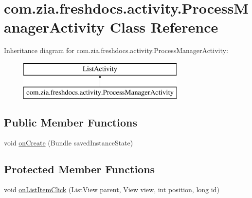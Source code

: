 \hypertarget{classcom_1_1zia_1_1freshdocs_1_1activity_1_1_process_manager_activity}{\section{com.\-zia.\-freshdocs.\-activity.\-Process\-Manager\-Activity Class Reference}
\label{classcom_1_1zia_1_1freshdocs_1_1activity_1_1_process_manager_activity}
}
Inheritance diagram for com.\-zia.\-freshdocs.\-activity.\-Process\-Manager\-Activity\-:\begin{figure}[H]
\begin{center}
\leavevmode
\includegraphics[height=2.000000cm]{classcom_1_1zia_1_1freshdocs_1_1activity_1_1_process_manager_activity}
\end{center}
\end{figure}
\subsection*{Public Member Functions}
\begin{DoxyCompactItemize}
\item 
void \hyperlink{classcom_1_1zia_1_1freshdocs_1_1activity_1_1_process_manager_activity_a090ed543331a39bb1f3e2dd7ce4f54d5}{on\-Create} (Bundle saved\-Instance\-State)
\end{DoxyCompactItemize}
\subsection*{Protected Member Functions}
\begin{DoxyCompactItemize}
\item 
void \hyperlink{classcom_1_1zia_1_1freshdocs_1_1activity_1_1_process_manager_activity_af6e72a396f9c271c19e9cb53522980fd}{on\-List\-Item\-Click} (List\-View parent, View view, int position, long id)
\end{DoxyCompactItemize}


